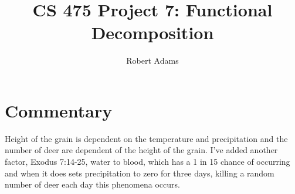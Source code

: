 \documentclass[letterpaper,10pt]{article} %
\begin{document}
\title{CS 475 Project 7: Functional Decomposition} 
\author{Robert Adams}
\maketitle



\section{Commentary}

	Height of the grain is dependent on the temperature and precipitation and the number of deer are dependent of the height of the grain.  I’ve added another factor, Exodus 7:14-25, water to blood, which has a 1 in 15 chance of occurring and when it does sets precipitation to zero for three days, killing a random number of deer each day this phenomena occurs. 

\begin{figure} [h]
	\centering
	
	\label{runtimes}
\end{figure}
\end{document}
